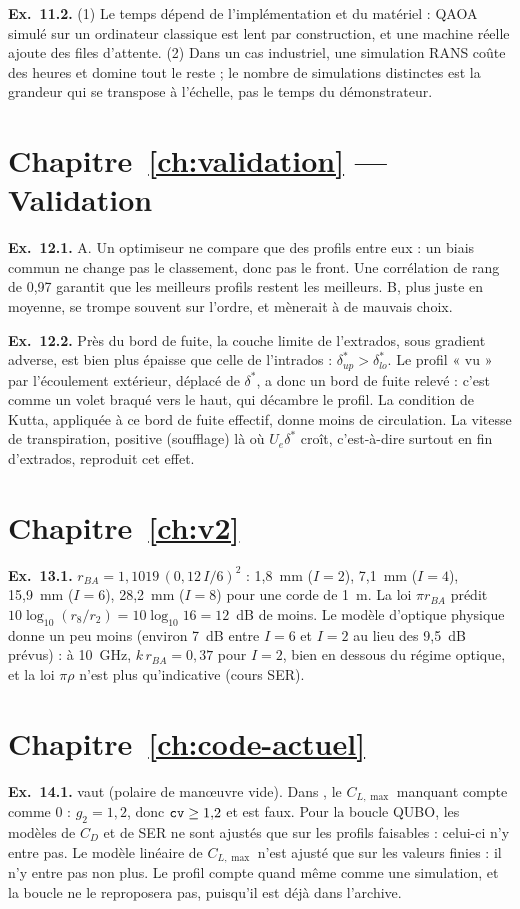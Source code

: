 \textbf{Ex.~11.2.} (1) Le temps dépend de l'implémentation et du matériel : QAOA simulé sur un ordinateur classique est lent par construction, et une machine réelle ajoute des files d'attente. (2) Dans un cas industriel, une simulation RANS coûte des heures et domine tout le reste ; le nombre de simulations distinctes est la grandeur qui se transpose à l'échelle, pas le temps du démonstrateur.

\section*{Chapitre~\ref{ch:validation} — Validation}
\textbf{Ex.~12.1.} A. Un optimiseur ne compare que des profils entre eux : un biais commun ne change pas le classement, donc pas le front. Une corrélation de rang de 0,97 garantit que les meilleurs profils restent les meilleurs. B, plus juste en moyenne, se trompe souvent sur l'ordre, et mènerait à de mauvais choix.

\textbf{Ex.~12.2.} Près du bord de fuite, la couche limite de l'extrados, sous gradient adverse, est bien plus épaisse que celle de l'intrados : $\delta^*_{up}>\delta^*_{lo}$. Le profil « vu » par l'écoulement extérieur, déplacé de $\delta^*$, a donc un bord de fuite relevé : c'est comme un volet braqué vers le haut, qui décambre le profil. La condition de Kutta, appliquée à ce bord de fuite effectif, donne moins de circulation. La vitesse de transpiration, positive (soufflage) là où $U_e\delta^*$ croît, c'est-à-dire surtout en fin d'extrados, reproduit cet effet.

\section*{Chapitre~\ref{ch:v2} }
\textbf{Ex.~13.1.} $r_{BA}=1{,}1019\,(0{,}12\,I/6)^2$ : 1,8~mm ($I=2$), 7,1~mm ($I=4$), 15,9~mm ($I=6$), 28,2~mm ($I=8$) pour une corde de 1~m. La loi $\pi r_{BA}$ prédit $10\log_{10}(r_8/r_2)=10\log_{10}16=12$~dB de moins. Le modèle d'optique physique donne un peu moins (environ 7~dB entre $I=6$ et $I=2$ au lieu des 9,5~dB prévus) : à 10~GHz, $k\,r_{BA}=0{,}37$ pour $I=2$, bien en dessous du régime optique, et la loi $\pi\rho$ n'est plus qu'indicative (cours SER).

\section*{Chapitre~\ref{ch:code-actuel} }
\textbf{Ex.~14.1.}  vaut  (polaire de manœuvre vide). Dans , le $C_{L,\max}$ manquant compte comme 0 : $g_2=1{,}2$, donc $\texttt{cv}\ge1{,}2$ et  est faux. Pour la boucle QUBO, les modèles de $C_D$ et de SER ne sont ajustés que sur les profils faisables : celui-ci n'y entre pas. Le modèle linéaire de $C_{L,\max}$ n'est ajusté que sur les valeurs finies : il n'y entre pas non plus. Le profil compte quand même comme une simulation, et la boucle ne le reproposera pas, puisqu'il est déjà dans l'archive.

